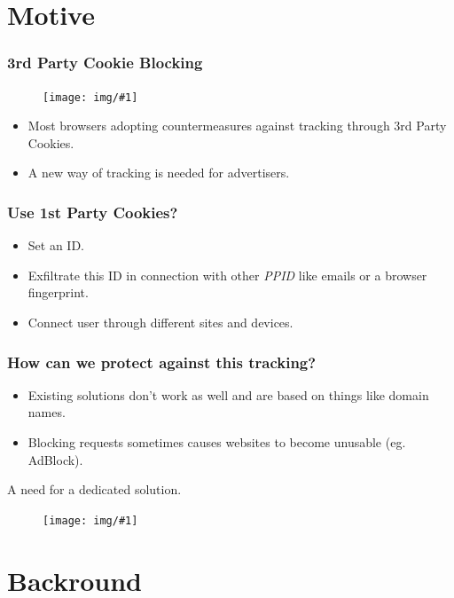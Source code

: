 \documentclass{beamer}
\newcommand{\pic}[1]{
\begin{figure}
\vspace{1cm}
\texttt{[image: img/\#1]}
\end{figure}
}
\begin{document}
\section{Motive}

\begin{frame}
\frametitle{3rd Party Cookie Blocking}

\pic{ie}

\begin{itemize}
\item Most browsers adopting countermeasures against tracking through 3rd Party Cookies.
\item A new way of tracking is needed for advertisers.
\end{itemize}

\end{frame}

\begin{frame}
\frametitle{Use 1st Party Cookies?}

\begin{itemize}
\item Set an ID.
\item Exfiltrate this ID in connection with other \textit{PPID} like emails or a browser fingerprint.
\item Connect user through different sites and devices.
\end{itemize}

\end{frame}

\begin{frame}
\frametitle{How can we protect against this tracking?}

\begin{itemize}
\item Existing solutions don't work as well and are based on things like domain names.
\item Blocking requests sometimes causes websites to become unusable (eg. AdBlock).
\end{itemize}

\end{frame}

\begin{frame}
\centering
A need for a dedicated solution.

\pic{solution}
\end{frame}


\section{Backround}
\end{document}

